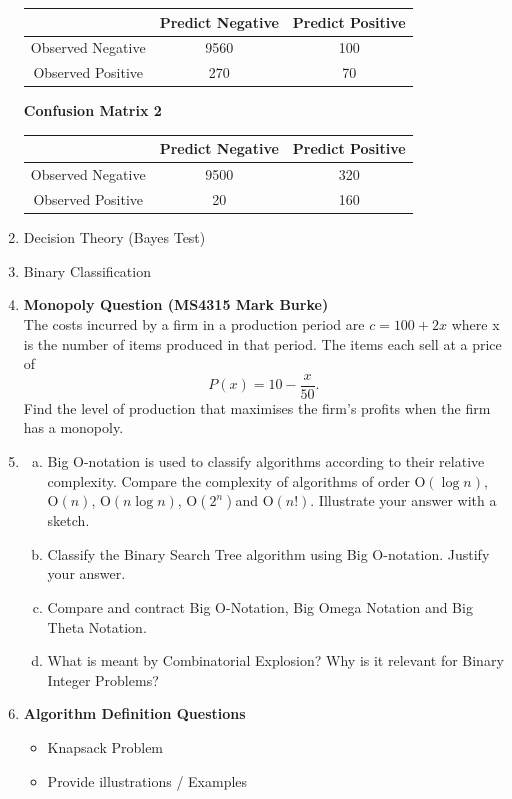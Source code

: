 \documentclass[]{report}
\begin{document}
\begin{enumerate}
\begin{center}
	\begin{tabular}{|c||c|c|}
		\hline 
		& Predict Negative & Predict Positive \\ \hline  \hline 
		Observed Negative & 9560 &  100 \\ \hline 
		Observed Positive & 270 & 70 \\ \hline 
	\end{tabular} 
\end{center}
\noindent \textbf{Confusion Matrix 2}
\begin{center}
	\begin{tabular}{|c||c|c|}
		\hline 
		& Predict Negative & Predict Positive \\ \hline  \hline 
		Observed Negative & 9500 &  320 \\ \hline 
		Observed Positive & 20 & 160 \\ \hline 
	\end{tabular} 
\end{center}
\item Decision Theory (Bayes Test)
\item Binary Classification
\item \textbf{Monopoly Question (MS4315 Mark Burke)}\\
The costs incurred by a firm in a production period are
$c = 100 + 2x$
where x is the number of items produced in that period. The items each sell
at a price of
\[P(x) = 10 - \frac{x}{50}. \]
Find the level of production that maximises the firm’s profits
when the firm has a monopoly.
 \item
 \begin{enumerate}[(a)]
 	\item Big O-notation is used to classify algorithms according to their relative complexity. Compare the complexity of algorithms of order $\mathrm{O}(\log n)$, $\mathrm{O}(n)$, $\mathrm{O}(n\log n)$, $\mathrm{O}(2^n)$and $\mathrm{O}(n!)$. Illustrate your answer with a sketch. 
 	\item Classify the Binary Search Tree algorithm using Big $\mathrm{O}$-notation. Justify your answer. 
 	\item Compare and contract Big O-Notation, Big Omega Notation and Big Theta Notation. 
 	
 	\item What is meant by Combinatorial Explosion? Why is it relevant for Binary Integer Problems? 
 	
 \end{enumerate}

\item \textbf{Algorithm Definition Questions}
\begin{multicols}{2}
	\begin{itemize}

		\item Knapsack Problem
		\item Provide illustrations / Examples
	\end{itemize}
\end{multicols}
 	



\end{enumerate}
\end{document}
